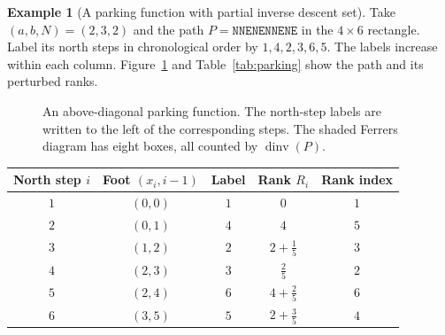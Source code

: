 \documentclass[12pt,reqno]{amsart}
\numberwithin{equation}{section}
\theoremstyle{definition}
\newtheorem*{example}{Example}
\theoremstyle{remark}
\theoremstyle{plain}
\DeclareMathOperator{\area}{area}
\DeclareMathOperator{\dinv}{dinv}
\DeclareMathOperator{\tdinv}{tdinv}
\DeclareMathOperator{\ides}{ides}
\begin{document}
\begin{example}[A parking function with partial inverse descent set]
Take $(a,b,N)=(2,3,2)$ and the path
$P=\mathtt{NNENENNENE}$ in the $4\times6$ rectangle.
Label its north steps in chronological order by $1,4,2,3,6,5$.
The labels increase within each column.
Figure~\ref{fig:parking} and Table~\ref{tab:parking} show the path and
its perturbed ranks.
\begin{figure}[!htbp]
\centering
{}
\caption{An above-diagonal parking function.  The north-step labels
are written to the left of the corresponding steps.
The shaded Ferrers diagram has eight boxes, all counted by $\dinv(P)$.}
\label{fig:parking}
\end{figure}
\par
\begin{table}[!htbp]
\centering\renewcommand{\arraystretch}{1.18}
\begin{tabular}{|c|c|c|c|c|}
\hline
North step $i$ & Foot $(x_i,i-1)$ & Label & Rank $R_i$ & Rank index\\\hline
$1$&$(0,0)$&$1$&$0$&$1$\\\hline
$2$&$(0,1)$&$4$&$4$&$5$\\\hline
$3$&$(1,2)$&$2$&$2+\tfrac15$&$3$\\\hline
$4$&$(2,3)$&$3$&$\tfrac25$&$2$\\\hline
$5$&$(2,4)$&$6$&$4+\tfrac25$&$6$\\\hline
$6$&$(3,5)$&$5$&$2+\tfrac35$&$4$\\\hline
\end{tabular}

\end{table}
\end{example}
\end{document}
